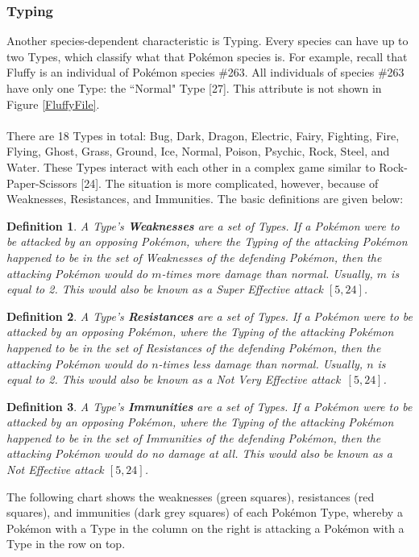 \documentclass{article}
\newtheorem*{definition*}{Definition}
\begin{document}
\subsubsection{Typing}
Another species-dependent characteristic is Typing. Every species can have up to two Types, which classify what that Pok\'emon species is. For example, recall that Fluffy is an individual of Pok\'emon species \#263. All individuals of species \#263 have only one Type: the ``Normal" Type [27]. This attribute is not shown in Figure \ref{FluffyFile}.\\\\
There are 18 Types in total: Bug, Dark, Dragon, Electric, Fairy, Fighting, Fire, Flying, Ghost, Grass, Ground, Ice, Normal, Poison, Psychic, Rock, Steel, and Water. These Types interact with each other in a complex game similar to Rock-Paper-Scissors [24]. The situation is more complicated, however, because of Weaknesses, Resistances, and Immunities. The basic definitions are given below:
\begin{definition*}
	A Type's \textbf{Weaknesses} are a set of Types. If a Pok\'emon were to be attacked by an opposing Pok\'emon, where the Typing of the attacking Pok\'emon happened to be in the set of Weaknesses of the defending Pok\'emon, then the attacking Pok\'emon would do $m$-times more damage than normal. Usually, $m$ is equal to 2. This would also be known as a Super Effective attack $[5,24]$.
\end{definition*}
\begin{definition*}
	A Type's \textbf{Resistances} are a set of Types. If a Pok\'emon were to be attacked by an opposing Pok\'emon, where the Typing of the attacking Pok\'emon happened to be in the set of Resistances of the defending Pok\'emon, then the attacking Pok\'emon would do $n$-times less damage than normal. Usually, $n$ is equal to 2. This would also be known as a Not Very Effective attack~$[5,24]$.
\end{definition*}
\begin{definition*}
	A Type's \textbf{Immunities} are a set of Types. If a Pok\'emon were to be attacked by an opposing Pok\'emon, where the Typing of the attacking Pok\'emon happened to be in the set of Immunities of the defending Pok\'emon, then the attacking Pok\'emon would do no damage at all. This would also be known as a Not Effective attack $[5,24]$.
\end{definition*}
The following chart shows the weaknesses (green squares), resistances (red squares), and immunities (dark grey squares) of each Pok\'emon Type, whereby a Pok\'emon with a Type in the column on the right is attacking a Pok\'emon with a Type in the row on top.
\end{document}
